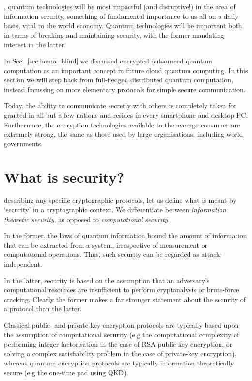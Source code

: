 %
%

, quantum technologies will be most impactful (and disruptive!) in the area of information security, something of fundamental importance to us all on a daily basis, vital to the world economy. Quantum technologies will be important both in terms of breaking and maintaining security, with the former mandating interest in the latter.

In Sec.~\ref{sec:homo_blind} we discussed encrypted outsourced quantum computation as an important concept in future cloud quantum computing. In this section we will step back from full-fledged distributed quantum computation, instead focussing on more elementary protocols for simple secure communication.

Today, the ability to communicate secretly with others is completely taken for granted in all but a few nations and resides in every smartphone and desktop PC. Furthermore, the encryption technologies available to the average consumer are extremely strong, the same as those used by large organisations, including world governments.

%
%

\section{What is security?}\label{sec:comp_vs_inf_th_sec}

 describing any specific cryptographic protocols, let us define what is meant by `security' in a cryptographic context. We differentiate between \textit{information theoretic security}, as opposed to \textit{computational security}.

In the former, the laws of quantum information bound the amount of information that can be extracted from a system, irrespective of measurement or computational operations. Thus, such security can be regarded as attack-independent.

In the latter, security is based on the assumption that an adversary's computational resources are insufficient to perform cryptanalysis or brute-force cracking. Clearly the former makes a far stronger statement about the security of a protocol than the latter.

Classical public- and private-key encryption protocols are typically based upon the assumption of computational security (e.g the computational complexity of performing integer factorisation in the case of RSA public-key encryption, or solving a complex satisfiability problem in the case of private-key encryption), whereas quantum encryption protocols are typically information theoretically secure (e.g the one-time pad using QKD).

